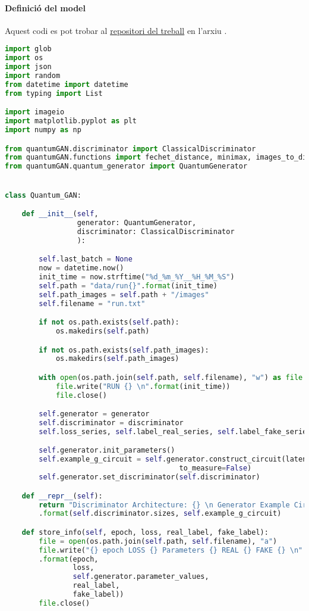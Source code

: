 \paragraph{Definició del model}
\label{lst:qgan}
Aquest codi es pot trobar al \href{https://github.com/tomiock/qGAN}{repositori del treball} en l'arxiu . 
\begin{lstlisting}[language=Python, caption=Codi per la definició del model]
import glob
import os
import json
import random
from datetime import datetime
from typing import List

import imageio
import matplotlib.pyplot as plt
import numpy as np

from quantumGAN.discriminator import ClassicalDiscriminator
from quantumGAN.functions import fechet_distance, minimax, images_to_distribution, images_to_scatter
from quantumGAN.quantum_generator import QuantumGenerator


class Quantum_GAN:

	def __init__(self,
				 generator: QuantumGenerator,
				 discriminator: ClassicalDiscriminator
				 ):

		self.last_batch = None
		now = datetime.now()
		init_time = now.strftime("%d_%m_%Y__%H_%M_%S")
		self.path = "data/run{}".format(init_time)
		self.path_images = self.path + "/images"
		self.filename = "run.txt"

		if not os.path.exists(self.path):
			os.makedirs(self.path)

		if not os.path.exists(self.path_images):
			os.makedirs(self.path_images)

		with open(os.path.join(self.path, self.filename), "w") as file:
			file.write("RUN {} \n".format(init_time))
			file.close()

		self.generator = generator
		self.discriminator = discriminator
		self.loss_series, self.label_real_series, self.label_fake_series, self.FD_score = [], [], [], []

		self.generator.init_parameters()
		self.example_g_circuit = self.generator.construct_circuit(latent_space_noise=None,
									 	 to_measure=False)
		self.generator.set_discriminator(self.discriminator)

	def __repr__(self):
		return "Discriminator Architecture: {} \n Generator Example Circuit: \n{}" \
		.format(self.discriminator.sizes, self.example_g_circuit)

	def store_info(self, epoch, loss, real_label, fake_label):
		file = open(os.path.join(self.path, self.filename), "a")
		file.write("{} epoch LOSS {} Parameters {} REAL {} FAKE {} \n"
		.format(epoch,
				loss,
				self.generator.parameter_values,
				real_label,
				fake_label))
		file.close()


\end{lstlisting}
